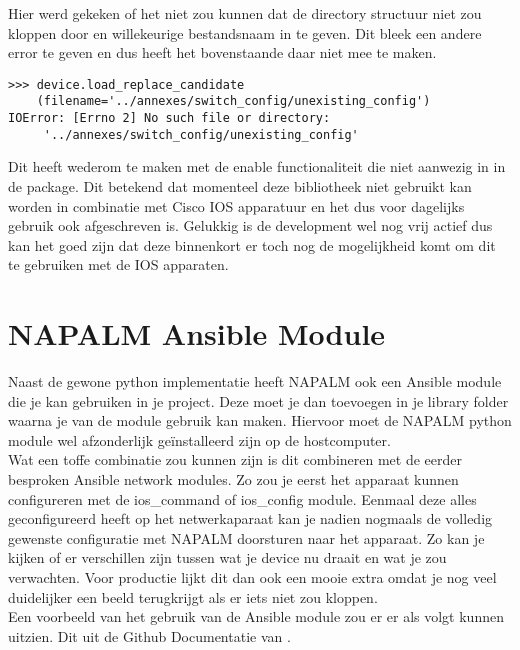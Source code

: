 Hier werd gekeken of het niet zou kunnen dat de directory structuur niet zou kloppen door en willekeurige bestandsnaam in te geven. Dit bleek een andere error te geven en dus heeft het bovenstaande daar niet mee te maken.

\begin{center}
\begin{Verbatim}
>>> device.load_replace_candidate
    (filename='../annexes/switch_config/unexisting_config')
IOError: [Errno 2] No such file or directory: 
     '../annexes/switch_config/unexisting_config'
\end{Verbatim}
\end{center}

Dit heeft wederom te maken met de enable functionaliteit die niet aanwezig in in de package. Dit betekend dat momenteel deze bibliotheek niet gebruikt kan worden in combinatie met Cisco IOS apparatuur en het dus voor dagelijks gebruik ook afgeschreven is. Gelukkig is de development wel nog vrij actief dus kan het goed zijn dat deze binnenkort er toch nog de mogelijkheid komt om dit te gebruiken met de IOS apparaten.

\section{NAPALM Ansible Module}
\label{ch:napalmansible}
Naast de gewone python implementatie heeft NAPALM ook een Ansible module die je kan gebruiken in je project. Deze moet je dan toevoegen in je library folder waarna je van de module gebruik kan maken. Hiervoor moet de NAPALM python module wel afzonderlijk geïnstalleerd zijn op de hostcomputer. 
\\

Wat een toffe combinatie zou kunnen zijn is dit combineren met de eerder besproken Ansible network modules. Zo zou je eerst het apparaat kunnen configureren met de ios\_command of ios\_config module. Eenmaal deze alles geconfigureerd heeft op het netwerkaparaat kan je nadien nogmaals de volledig gewenste configuratie met NAPALM doorsturen naar het apparaat. Zo kan je kijken of er verschillen zijn tussen wat je device nu draait en wat je zou verwachten. Voor productie lijkt dit dan ook een mooie extra omdat je nog veel duidelijker een beeld terugkrijgt als er iets niet zou kloppen.
\\

Een voorbeeld van het gebruik van de Ansible module zou er er als volgt kunnen uitzien. Dit uit de Github Documentatie van \textcite{napalmAnsible}.

